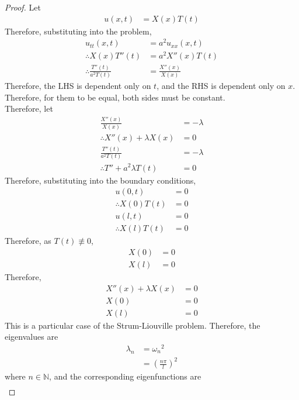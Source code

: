 \documentclass[titlepage, fleqn, a4paper, 12pt, twoside]{article}
\theoremstyle{definition}
\theoremstyle{theorem}
\begin{document}
\begin{proof}
	Let
	\begin{align*}
		u(x,t) & = X(x) T(t)
	\end{align*}
	Therefore, substituting into the problem,
	\begin{align*}
		u_{t t}(x,t)                       & = a^2 u_{x x}(x,t) \\
		\therefore X(x) T''(t)             & = a^2 X''(x) T(t)  \\
		\therefore \frac{T''(t)}{a^2 T(t)} & = \frac{X''(x)}{X(x)}
	\end{align*}
	Therefore, the LHS is dependent only on $t$, and the RHS is dependent only on $x$.
	Therefore, for them to be equal, both sides must be constant.\\
	Therefore, let
	\begin{align*}
		\frac{X''(x)}{X(x)}               & = -\lambda \\
		\therefore X''(x) + \lambda X(x)  & = 0        \\
		\frac{T''(t)}{a^2 T(t)}           & = -\lambda \\
		\therefore T'' + a^2 \lambda T(t) & = 0
	\end{align*}
	Therefore, substituting into the boundary conditions,
	\begin{align*}
		u(0,t)               & = 0 \\
		\therefore X(0) T(t) & = 0 \\
		u(l,t)               & = 0 \\
		\therefore X(l) T(t) & = 0
	\end{align*}
	Therefore, as $T(t) \not\equiv 0$,
	\begin{align*}
		X(0) & = 0 \\
		X(l) & = 0
	\end{align*}
	Therefore,
	\begin{align*}
		X''(x) + \lambda X(x) & = 0 \\
		X(0)                  & = 0 \\
		X(l)                  & = 0
	\end{align*}
	This is a particular case of the Strum-Liouville problem.
	Therefore, the eigenvalues are
	\begin{align*}
		\lambda_n & = {\omega_n}^2 \\
                          & = \left( \frac{n \pi}{l} \right)^2
	\end{align*}
	where $n \in \mathbb{N}$, and the corresponding eigenfunctions are
	\begin{align*}

\end{align*}
\end{proof}
\end{document}
